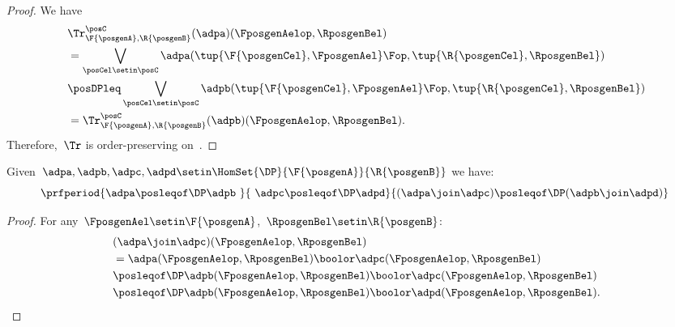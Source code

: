 \begin{proof}
    We have
    \begin{equation}
        \label{eq:trace_pres_ord}
        \begin{aligned}
            ~ & \Tr_{\F{\posgenA},\R{\posgenB}}^\posC(\adpa)(\FposgenAelop,\RposgenBel) \\
              & = \bigvee_{\posCel\setin \posC}\adpa(\tup{\F{\posgenCel},\FposgenAel}\Fop,\tup{\R{\posgenCel},\RposgenBel}) \\
              & \posDPleq \bigvee_{\posCel\setin \posC}\adpb(\tup{\F{\posgenCel},\FposgenAel}\Fop,\tup{\R{\posgenCel},\RposgenBel}) \\
              & =\Tr_{\F{\posgenA},\R{\posgenB}}^\posC(\adpb)(\FposgenAelop,\RposgenBel).
        \end{aligned}
    \end{equation}
    Therefore,~$\Tr$ is order-preserving on~\DP.
\end{proof}

\begin{lemma}
    \label{lem:coprod_mon}
    Given~$\adpa,\adpb,\adpc,\adpd \setin \HomSet{\DP}{\F{\posgenA}}{\R{\posgenB}}$ we have:
    \begin{equation}
        \prfperiod{\adpa\posleqof\DP \adpb\ }{\ \adpc\posleqof\DP\adpd}{(\adpa\join\adpc)\posleqof\DP (\adpb\join \adpd)}
    \end{equation}
\end{lemma}
\begin{proof}
    For any~$\FposgenAel\setin \F{\posgenA}$,~$\RposgenBel\setin \R{\posgenB}$:
    \begin{equation}
        \begin{aligned}
            ~ & (\adpa \join \adpc)(\FposgenAelop,\RposgenBel) \\
              & =\adpa(\FposgenAelop,\RposgenBel)\boolor \adpc(\FposgenAelop,\RposgenBel) \\
              & \posleqof\DP \adpb(\FposgenAelop,\RposgenBel)\boolor \adpc(\FposgenAelop,\RposgenBel) \\
              & \posleqof\DP \adpb(\FposgenAelop,\RposgenBel)\boolor \adpd(\FposgenAelop,\RposgenBel).
        \end{aligned}
    \end{equation}
\end{proof}

